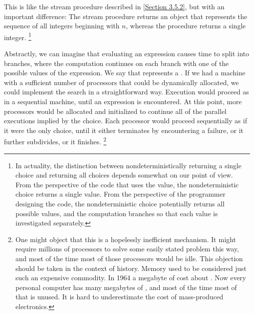 This is like the stream procedure  described in \cref{Section 3.5.2}, but with an important difference:
The stream procedure returns an object that represents the sequence of all integers beginning with \( n \), whereas the  procedure returns a single integer.%
\footnote{
	In actuality, the distinction between nondeterministically returning a single choice and returning all choices depends somewhat on our point of view.
	From the perspective of the code that uses the value, the nondeterministic choice returns a single value.
	From the perspective of the programmer designing the code, the nondeterministic choice potentially returns all possible values, and the computation branches so that each value is investigated separately.
}

Abstractly, we can imagine that evaluating an  expression causes time to split into branches, where the computation continues on each branch with one of the possible values of the expression.
We say that  represents a .
If we had a machine with a sufficient number of processors that could be dynamically allocated, we could implement the search in a straightforward way.
Execution would proceed as in a sequential machine, until an  expression is encountered.
At this point, more processors would be allocated and initialized to continue all of the parallel executions implied by the choice.
Each processor would proceed sequentially as if it were the only choice, until it either terminates by encountering a failure, or it further subdivides, or it finishes.%
\footnote{
	One might object that this is a hopelessly inefficient mechanism.
	It might require millions of processors to solve some easily stated problem this way, and most of the time most of those processors would be idle.
	This objection should be taken in the context of history.
	Memory used to be considered just such an expensive commodity.
	In 1964 a megabyte of  cost about .
	Now every personal computer has many megabytes of , and most of the time most of that  is unused.
	It is hard to underestimate the cost of mass-produced electronics.
}

